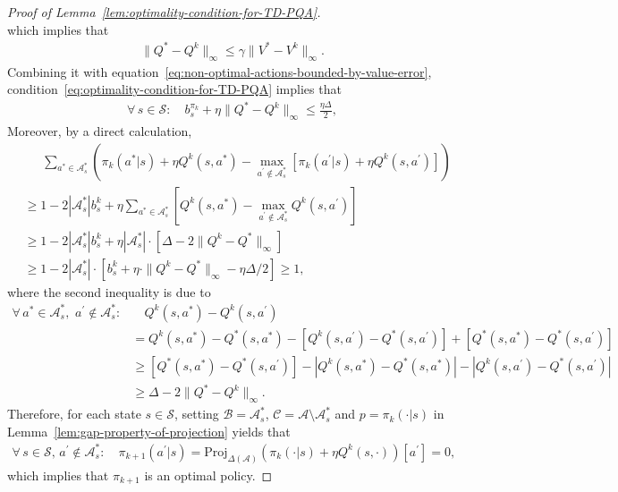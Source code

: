 \documentclass[10pt]{article}
\newcommand{\Proj}{\text{Proj}}
\newcommand{\calA}{\mathcal{A}}
\newcommand{\calS}{\mathcal{S}}
\newcommand{\ls}{\left}
\newcommand{\rs}{\right}
\theoremstyle{plain}
\theoremstyle{definition}
\begin{document}
\begin{proof}[Proof of Lemma~\ref{lem:optimality-condition-for-TD-PQA}]
\[    \]
    which implies that 
    \begin{align*}
        \| Q^* - Q^k \|_\infty \leq \gamma \| V^* - V^k \|_\infty.
    \end{align*}
    Combining it with equation~\eqref{eq:non-optimal-actions-bounded-by-value-error}, condition~\eqref{eq:optimality-condition-for-TD-PQA} implies that
    \begin{align*}
        \forall\, s\in\calS: \quad b^{\pi_k}_s + \eta \| Q^* - Q^k \|_\infty \leq \frac{\eta\Delta}{2},
    \end{align*}
    Moreover, by a direct calculation,
    \begin{align*}
        &{\phantom{sdf}}\sum_{a^*\in\calA^*_s} \ls( \pi_k(a^*|s) + \eta Q^k(s,a^*) - \max_{a^\prime\not\in\calA^*_s} \ls[ \pi_k(a^\prime|s) + \eta Q^k(s,a^\prime) \rs] \rs) \\
        &\geq 1- 2 |\calA^*_s| b_s^k + \eta \sum_{a^*\in\calA^*_s} \ls[Q^k(s,a^*) - \max_{a^\prime\not\in\calA^*_s} Q^k(s,a^\prime) \rs] \\
        &\geq 1 - 2|\calA^*_s|b_s^k + \eta |\calA^*_s| \cdot [\Delta - 2\| Q^k - Q^* \|_\infty] \\[.5em]
        &\geq 1 - 2|\calA^*_s| \cdot [b_s^k + \eta \cdot \| Q^k - Q^* \|_\infty - \eta\Delta /2] \geq 1,
    \end{align*}
    where the second inequality is due to
    \begin{align*}
        \forall\, a^*\in\calA^*_s , \,\, a^\prime \not\in\calA^*_s: &\quad Q^k(s,a^*) - Q^k(s,a^\prime) \\
        &= Q^k(s,a^*) - Q^*(s,a^*) - [Q^k(s,a^\prime) - Q^*(s, a^\prime)] + [Q^*(s,a^*) - Q^*(s,a^\prime)] \\
        &\geq [Q^*(s,a^*) - Q^*(s,a^\prime)] - |Q^k(s,a^*) - Q^*(s,a^*)| - |Q^k(s,a^\prime) - Q^*(s, a^\prime)| \\
        &\geq \Delta - 2\| Q^* - Q^k \|_\infty.
    \end{align*}
    Therefore, for each state $s\in\calS$, setting $\mathcal{B} = \calA^*_s$, $\mathcal{C} = \calA \setminus \calA^*_s$ and $p = \pi_k(\cdot|s)$ in Lemma~\ref{lem:gap-property-of-projection} yields that
    \begin{align*}
        \forall\, s\in\calS, \, a^\prime\not\in\calA^*_s: \quad \pi_{k+1}(a^\prime|s) = \Proj_{\Delta(\calA)} \ls( \pi_k(\cdot|s) + \eta Q^k(s,\cdot) \rs)[a^\prime] = 0,
    \end{align*}
    which implies that $\pi_{k+1}$ is an optimal policy. 


\end{proof}
\end{document}
